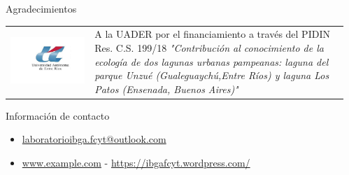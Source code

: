 \documentclass[final]{beamer}
\newlength{\sepmargin}
\newlength{\onecolwid}
\begin{document}
\begin{frame}[t]
\begin{columns}[t]
\begin{column}{\onecolwid}
\begin{block}{ }
		\end{block}
      \end{column}
      
      \begin{column}{\sepmargin} \end{column}
      \end{columns} 
       
      \begin{columns}[t] %
      
      \begin{column}{\sepmargin} \end{column}
        \begin{column}{\onecolwid} %
			\begin{block}{\large Agradecimientos}
                    \begin{center}
						\begin{tabular}{SL}
							\includegraphics[width=\linewidth]{uader.jpg}  &
							\footnotesize A la UADER por el financiamiento a través del PIDIN Res. C.S. 199/18 \textit{"Contribución al conocimiento de la ecología de dos lagunas urbanas pampeanas: laguna del parque Unzué (Gualeguaychú,Entre Ríos) y laguna Los Patos (Ensenada, Buenos Aires)"}
						\end{tabular}
					\end{center}
				\end{block}	
                \vspace*{-0.9cm}
				\begin{alertblock}{\large Información de contacto}
                \vspace*{-0.5cm}
					\begin{footnotesize}
					\begin{itemize}
						\item \href{mailto:email@meduniwien.ac.at}{laboratorioibga.fcyt@outlook.com}
						\item \href{http://www.example.com/}{www.example.com} - \href{www.meduniwien.ac.at/medstat}{https://ibgafcyt.wordpress.com/}
					\end{itemize}
					\end{footnotesize}	
					

\end{alertblock}
\end{column}
\end{columns}
\end{frame}
\end{document}
